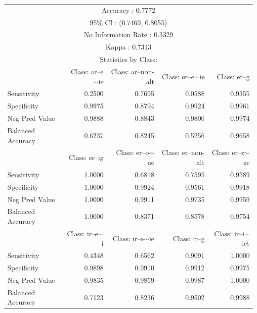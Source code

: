 \begin{table}
  \centering
  \scriptsize
  \begin{tabular}{lrrrr}
    \lsptoprule
    \multicolumn{5}{c}{Overall Statistics}                                     \\
    \midrule
    \multicolumn{5}{c}{Accuracy : 0.7772}\\
    \multicolumn{5}{c}{95\% CI : (0.7469, 0.8055)}\\
    \multicolumn{5}{c}{No Information Rate : 0.3329}\\
    \multicolumn{5}{c}{Kappa : 0.7313}\\
    \midrule
    \multicolumn{5}{c}{Statistics by Class:}                                   \\
    \midrule
 &    Class: ar--e$\sim$ie& Class: ar--non-alt& Class: er--e$\sim$ie &Class: er--g\\

    Sensitivity      &             0.2500&             0.7695&          0.0588 &      0.9355\\
    Specificity      &             0.9975&             0.8794&          0.9924 &      0.9961\\
    Neg Pred Value   &             0.9888&             0.8843&          0.9800 &      0.9974\\
    Balanced Accuracy&             0.6237&             0.8245&          0.5256 &      0.9658\\

 &   Class: er--ig &Class: er--o$\sim$ue& Class: er--non-alt &Class: er--z$\sim$zc\\

    Sensitivity        &          1.0000 &         0.6818&             0.7595 &         0.9589\\
    Specificity        &          1.0000 &         0.9924&             0.9561 &         0.9918\\
    Neg Pred Value     &          1.0000 &         0.9911&             0.9735 &         0.9959\\
    Balanced Accuracy  &          1.0000 &         0.8371&             0.8578 &         0.9754\\

 &    Class: ir--e$\sim$i &Class: ir--e$\sim$ie& Class: ir--g &Class: ir--i$\sim$iet\\

    Sensitivity       &            0.4348 &         0.6562&       0.9091 &          1.0000\\
    Specificity       &            0.9898 &         0.9910&       0.9912 &          0.9975\\
    Neg Pred Value    &            0.9835 &         0.9859&       0.9987 &          1.0000\\
    Balanced Accuracy &            0.7123 &         0.8236&       0.9502 &          0.9988\\


\end{tabular}
\end{table}
